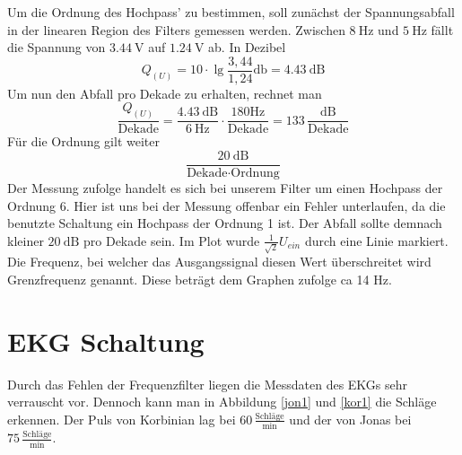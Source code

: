 Um die Ordnung des Hochpass' zu bestimmen, soll zunächst der Spannungsabfall in
der linearen Region des Filters gemessen werden. Zwischen $\SI{8}{\hertz}$ und $\SI{5}{\hertz}$
fällt die Spannung von $\SI{3,44}{\volt}$ auf $\SI{1,24}{\volt}$ ab. In
Dezibel
\[
Q_{(U)} = 10 \cdot \lg \frac{3,44}{1,24} \si{\decibel} = \SI{4,43}{\dB}
\]
Um nun den Abfall pro Dekade zu erhalten, rechnet man
\[
\frac{Q_{(U)} }{\text{Dekade}} = \frac{ \SI{4,43}{\dB} }{ \SI{6}
{\Hz}} \cdot \frac{ 180 \text{Hz} }{\text{Dekade}} = 133 \, \frac{
\si{\dB}}{\text{Dekade}}
\]
Für die Ordnung gilt weiter
\[
\frac{ \SI{20}{\dB} }{\text{Dekade} \cdot \text{Ordnung} }
\]
Der Messung zufolge handelt es sich bei unserem Filter um einen Hochpass der Ordnung 6.
Hier ist uns bei der Messung offenbar ein Fehler unterlaufen, da die benutzte 
Schaltung ein Hochpass der Ordnung 1 ist. Der Abfall sollte demnach kleiner
$\SI{20}{\dB}$ pro Dekade sein.
Im Plot wurde $\frac{1}{\sqrt{2}} U_{ein}$ durch eine Linie markiert.
Die Frequenz, bei welcher das Ausgangssignal diesen Wert überschreitet wird
Grenzfrequenz genannt. Diese beträgt dem Graphen zufolge ca 14 Hz. 

\section{EKG Schaltung}

Durch das Fehlen der Frequenzfilter liegen die Messdaten des EKGs sehr
verrauscht vor. Dennoch kann man in Abbildung \ref{jon1} und \ref{kor1} die
Schläge erkennen. 
Der Puls von Korbinian lag bei $60 \, \frac{ \text{Schläge}}{\text{min}}$ und der von
Jonas bei $75 \, \frac{\text{Schläge}}{\text{min}}$.


